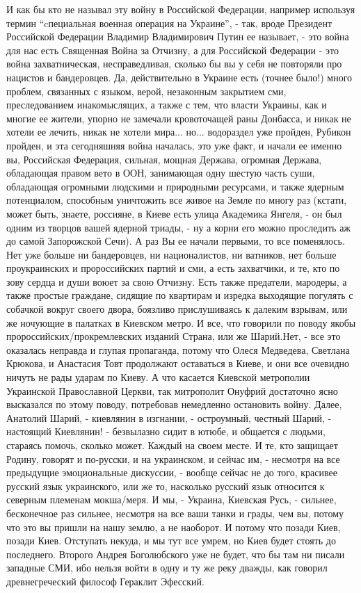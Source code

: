 И как бы кто не называл эту войну
в Российской Федерации, например используя термин \enquote{cпециальная военная
операция на Украине}, - так, вроде Президент Российской Федерации Владимир
Владимирович Путин ее называет, - это война для нас есть Священная Война за
Отчизну, а для Российской Федерации - это война захватническая, несправедливая,
сколько бы вы у себя не повторяли про нацистов и бандеровцев. Да, действительно
в Украине есть (точнее было!) много проблем, связанных с языком, верой,
незаконным закрытием сми, преследованием инакомыслящих, а также с тем, что
власти Украины, как и многие ее жители, упорно не замечали кровоточащей раны
Донбасса, и никак не хотели ее лечить, никак не хотели мира... но... водораздел
уже пройден, Рубикон пройден, и эта сегодняшняя война началась, это уже факт, и
начали ее именно вы, Российская Федерация, сильная, мощная Держава, огромная
Держава, обладающая правом вето в ООН, занимающая одну шестую часть суши,
обладающая огромными людскими и природными ресурсами, и также ядерным
потенциалом, способным уничтожить все живое на Земле по многу раз (кстати,
может быть, знаете, россияне, в Киеве есть улица Академика Янгеля, -  он был
одним из творцов вашей ядерной триады, - ну а корни его можно проследить аж до
самой Запорожской Сечи). А раз Вы ее начали первыми, то все поменялось. Нет
уже больше ни бандеровцев, ни националистов, ни ватников, нет больше
проукраинских и пророссийских партий и сми, а есть захватчики, и те, кто по
зову сердца и души воюет за свою Отчизну. Есть также предатели, мародеры, а
также простые граждане, сидящие по квартирам и изредка выходящие погулять с
собачкой вокруг своего двора, боязливо прислушиваясь к далеким взрывам, или же
ночующие в палатках в Киевском метро. И все, что говорили по поводу якобы
пророссийских/прокремлевских изданий Страна, или же Шарий.Нет, - все это
оказалась неправда и глупая пропаганда, потому что Олеся Медведева, Светлана
Крюкова, и Анастасия Товт продолжают оставаться в Киеве, и они все очевидно
ничуть не рады ударам по Киеву. А что касается Киевской метрополии Украинской
Православной Церкви, так митрополит Онуфрий достаточно ясно высказался по этому
поводу, потребовав немедленно остановить войну. Далее, Анатолий Шарий, -
киевлянин в изгнании, - остроумный, честный Шарий, - настоящий Киевлянин! -
безвылазно сидит в ютюбе, и общается с людьми, стараясь помочь, сколько может.
Каждый на своем месте. И те, кто защищает Родину, говорят и по-русски, и на
украинском, и сейчас им, - несмотря на все предыдущие эмоциональные дискуссии,
- вообще сейчас не до того, красивее русский язык украинского, или же то,
насколько русский язык относится к северным племенам мокша/меря. И мы, -
Украина, Киевская Русь, - сильнее, бесконечное раз сильнее, несмотря на все
ваши танки и грады, чем вы, потому что это вы пришли на нашу землю, а не
наоборот. И потому что позади Киев, позади Киев. Отступать некуда, и мы тут все
умрем, но Киев будет стоять до последнего. Второго Андрея Боголюбского уже не
будет, что бы там ни писали западные СМИ, ибо нельзя войти в одну и ту же реку
дважды, как говорил древнегреческий философ Гераклит Эфесский.

